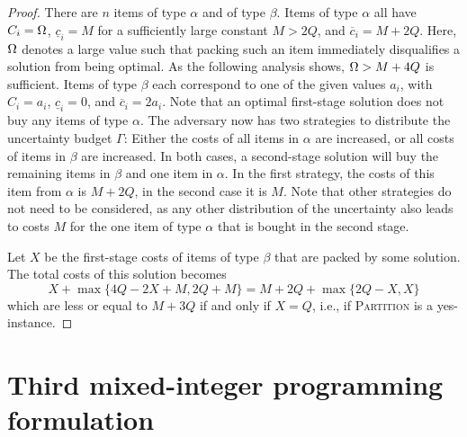 \begin{proof}
There are $n$ items of type $\alpha$ and of type $\beta$. Items of type $\alpha$ all have $C_i=\Omega$, $\underline{c}_i=M$ for a sufficiently large constant $M > 2Q$, and $\overline{c}_i = M+2Q$. Here, $\Omega$ denotes a large value such that packing such an item immediately disqualifies a solution from being optimal. As the following analysis shows, $\Omega > M+4Q$ is sufficient.
Items of type $\beta$ each correspond to one of the given values $a_i$, with $C_i = a_i$, $\underline{c}_i=0$, and $\overline{c}_i=2a_i$. Note that an optimal first-stage solution does not buy any items of type $\alpha$. The adversary now has two strategies to distribute the uncertainty budget $\Gamma$: Either the costs of all items in $\alpha$ are increased, or all costs of items in $\beta$ are increased. In both cases, a second-stage solution will buy the remaining items in $\beta$ and one item in $\alpha$. In the first strategy, the costs of this item from $\alpha$ is $M+2Q$, in the second case it is $M$. Note that other strategies do not need to be considered, as any other distribution of the uncertainty also leads to costs $M$ for the one item of type $\alpha$ that is bought in the second stage.

Let $X$ be the first-stage costs of items of type $\beta$ that are packed by some solution. The total costs of this solution becomes
\[ X + \max\{ 4Q - 2X +M , 2Q+M \} = M + 2Q + \max\{ 2Q-X, X \} \]
which are less or equal to $M+3Q$ if and only if $X=Q$, i.e., if \textsc{Partition} is a yes-instance.


\end{proof}



\section{Third mixed-integer programming formulation}
\label{sec:compact}

